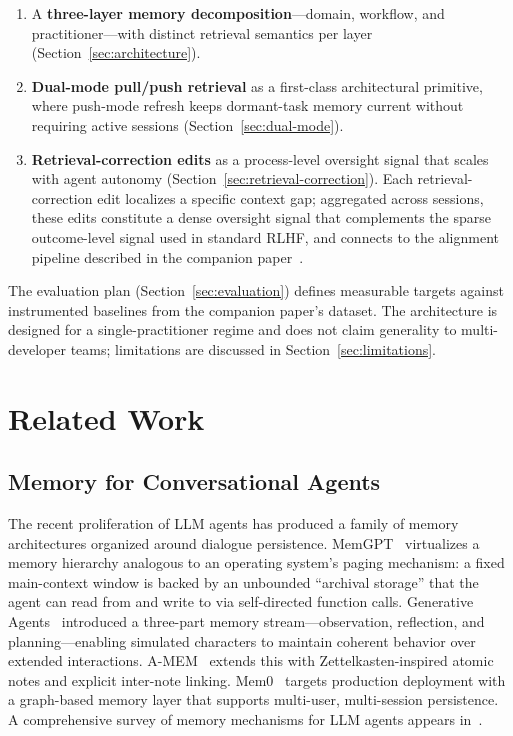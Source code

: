 \documentclass[11pt]{article}
\begin{document}
\begin{enumerate}[leftmargin=*, nosep]
  \item A \textbf{three-layer memory decomposition}---domain, workflow, and practitioner---with distinct retrieval semantics per layer (Section~\ref{sec:architecture}).
  \item \textbf{Dual-mode pull/push retrieval} as a first-class architectural primitive, where push-mode refresh keeps dormant-task memory current without requiring active sessions (Section~\ref{sec:dual-mode}).
  \item \textbf{Retrieval-correction edits} as a process-level oversight signal that scales with agent autonomy (Section~\ref{sec:retrieval-correction}). Each retrieval-correction edit localizes a specific context gap; aggregated across sessions, these edits constitute a dense oversight signal that complements the sparse outcome-level signal used in standard RLHF, and connects to the alignment pipeline described in the companion paper~\citep{ovcharov2026recursive}.
\end{enumerate}

The evaluation plan (Section~\ref{sec:evaluation}) defines measurable targets against instrumented baselines from the companion paper's dataset.
The architecture is designed for a single-practitioner regime and does not claim generality to multi-developer teams; limitations are discussed in Section~\ref{sec:limitations}.


\section{Related Work}
\label{sec:related}

\subsection{Memory for Conversational Agents}
\label{sec:related-memory}

The recent proliferation of LLM agents has produced a family of memory architectures organized around dialogue persistence.
MemGPT~\citep{packer2023memgpt} virtualizes a memory hierarchy analogous to an operating system's paging mechanism: a fixed main-context window is backed by an unbounded ``archival storage'' that the agent can read from and write to via self-directed function calls.
Generative Agents~\citep{park2023generative} introduced a three-part memory stream---observation, reflection, and planning---enabling simulated characters to maintain coherent behavior over extended interactions.
A-MEM~\citep{xu2024amem} extends this with Zettelkasten-inspired atomic notes and explicit inter-note linking.
Mem0~\citep{chhikara2025mem0} targets production deployment with a graph-based memory layer that supports multi-user, multi-session persistence.
A comprehensive survey of memory mechanisms for LLM agents appears in~\citet{zhang2024survey}.
\end{document}
